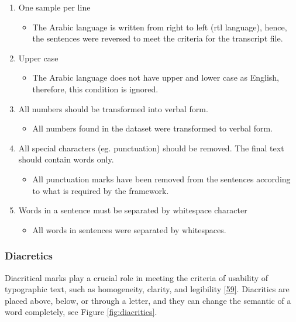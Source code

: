\documentclass[
  a4paper,
]{article}
\providecommand{\tightlist}{%
  \setlength{\itemsep}{0pt}\setlength{\parskip}{0pt}}
\begin{document}
\begin{enumerate}
\def\labelenumi{\arabic{enumi}.}
\tightlist
\item
  One sample per line

  \begin{itemize}
  \tightlist
  \item
    The Arabic language is written from right to left (rtl language),
    hence, the sentences were reversed to meet the criteria for the
    transcript file.
  \end{itemize}
\item
  Upper case

  \begin{itemize}
  \tightlist
  \item
    The Arabic language does not have upper and lower case as English,
    therefore, this condition is ignored.
  \end{itemize}
\item
  All numbers should be transformed into verbal form.

  \begin{itemize}
  \tightlist
  \item
    All numbers found in the dataset were transformed to verbal form.
  \end{itemize}
\item
  All special characters (eg. punctuation) should be removed. The final
  text should contain words only.

  \begin{itemize}
  \tightlist
  \item
    All punctuation marks have been removed from the sentences according
    to what is required by the framework.
  \end{itemize}
\item
  Words in a sentence must be separated by whitespace character

  \begin{itemize}
  \tightlist
  \item
    All words in sentences were separated by whitespaces.
  \end{itemize}
\end{enumerate}

\hypertarget{diacretics}{%
\subsubsection{Diacretics}\label{diacretics}}

Diacritical marks play a crucial role in meeting the criteria of
usability of typographic text, such as homogeneity, clarity, and
legibility \protect\hyperlink{ref-hssini2011design}{{[}59{]}}.
Diacritics are placed above, below, or through a letter, and they can
change the semantic of a word completely, see Figure
\ref{fig:diacritics}.
\end{document}
